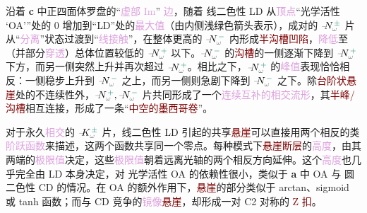 沿着 \textbf{c} 中\textcolor{NavyBlue}{正四面体罗盘}的“\textcolor{Plum}{虚部 Im}” \textcolor{Plum}{边}，随着 \textcolor{NavyBlue}{线二色性 LD} 从\textcolor{Plum}{顶点}“\textcolor{NavyBlue}{光学活性 `OA'}”处的 0 增加到“\textcolor{NavyBlue}{LD}”处的\textcolor{Plum}{最大值}（由内侧浅绿色箭头表示），成对的 $\xint{\mathcolor{gray}{-}}{10}{N}^{\;\!\textcolor{PineGreen}{\pm}}_{\mathcolor{gray}{\omega}}$ 片从“\textcolor{Plum}{分离}”状态过渡到“\textcolor{Plum}{线接触}”，在整体更高的 $\xint{\mathcolor{gray}{-}}{10}{N}^{\;\!\textcolor{PineGreen}{-}}_{\mathcolor{gray}{\omega}}$ 内形成\textcolor{Maroon}{半沟槽凹陷}，\textcolor{Plum}{降低}至（并部分\textcolor{Plum}{穿透}）总体位置较低的 $\xint{\mathcolor{gray}{-}}{10}{N}^{\;\!\textcolor{PineGreen}{+}}_{\mathcolor{gray}{\omega}}$ 以下。$\xint{\mathcolor{gray}{-}}{10}{N}^{\;\!\textcolor{PineGreen}{-}}_{\mathcolor{gray}{\omega}}$ 的\textcolor{Maroon}{沟槽}的一侧逐渐下降到 $\xint{\mathcolor{gray}{-}}{10}{N}^{\;\!\textcolor{PineGreen}{+}}_{\mathcolor{gray}{\omega}}$ 下方，而另一侧突然上升并再次超过 $\xint{\mathcolor{gray}{-}}{10}{N}^{\;\!\textcolor{PineGreen}{+}}_{\mathcolor{gray}{\omega}}$。相比之下，$\xint{\mathcolor{gray}{-}}{10}{N}^{\;\!\textcolor{PineGreen}{+}}_{\mathcolor{gray}{\omega}}$ 的\textcolor{Plum}{峰值}表现恰恰相反：一侧稳步上升到 $\xint{\mathcolor{gray}{-}}{10}{N}^{\;\!\textcolor{PineGreen}{-}}_{\mathcolor{gray}{\omega}}$ 之上，而另一侧则急剧下降到 $\xint{\mathcolor{gray}{-}}{10}{N}^{\;\!\textcolor{PineGreen}{-}}_{\mathcolor{gray}{\omega}}$ 之下。除\textcolor{Maroon}{台阶状悬崖}处的不连续性外，$\xint{\mathcolor{gray}{-}}{10}{N}^{\;\!\textcolor{PineGreen}{+}}_{\mathcolor{gray}{\omega}}, \xint{\mathcolor{gray}{-}}{10}{N}^{\;\!\textcolor{PineGreen}{-}}_{\mathcolor{gray}{\omega}}$ 片共同形成了一个\textcolor{Plum}{连续互补的相交流形}，其\textcolor{Maroon}{半峰/沟槽}相互连接，形成了一条“\textcolor{Maroon}{中空的墨西哥卷}”。

对于永久\textcolor{Plum}{相交}的 $\xint{\mathcolor{gray}{-}}{10}{K}^{\;\!\textcolor{PineGreen}{\pm}}_{\mathcolor{gray}{\omega}}$ 片，\textcolor{NavyBlue}{线二色性 LD} 引起的共享\textcolor{Maroon}{悬崖}可以直接用两个相反的类\textcolor{Plum}{阶跃函数}来描述，这两个函数共享同一个零点。每种\textcolor{PineGreen}{模式}下\textcolor{Maroon}{悬崖断层}的\textcolor{Plum}{高度}，由其两端的\textcolor{Plum}{极限值}决定，这些\textcolor{Plum}{极限值}朝着远离\textcolor{PineGreen}{光轴}的两个相反方向延伸。这个\textcolor{Plum}{高度}也几乎完全由 \textcolor{NavyBlue}{LD} 本身决定，对 \textcolor{NavyBlue}{光学活性 OA} 的依赖性很小，类似于 \textbf{a} 中 \textcolor{NavyBlue}{OA} 与 \textcolor{NavyBlue}{圆二色性 CD} 的情况。在 \textcolor{NavyBlue}{OA} 的额外作用下，\textcolor{Maroon}{悬崖}的部分类似于 arctan、sigmoid 或 tanh 函数；而与 \textcolor{NavyBlue}{CD} 竞争的\textcolor{Plum}{镜像}\textcolor{Maroon}{悬崖}，却形成一对 \textcolor{NavyBlue}{C2 对称}的 \textcolor{Maroon}{Z 扣}。


